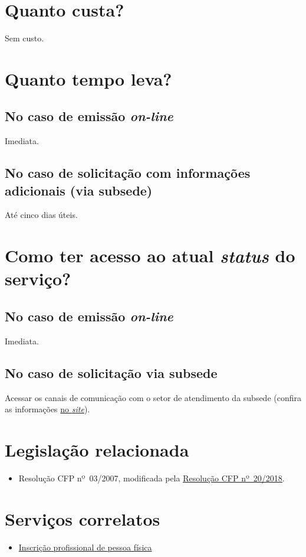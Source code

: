 \section{Quanto custa?}

Sem custo.
\vfill

\section{Quanto tempo leva?}

\subsection{No caso de emissão \emph{on-line}}

Imediata.

\subsection{No caso de solicitação com informações adicionais (via subsede)}

Até cinco dias úteis.
\vfill

\section{Como ter acesso ao atual \emph{status} do serviço?}

\subsection{No caso de emissão \emph{on-line}}

Imediata.

\subsection{No caso de solicitação via subsede}

Acessar os canais de comunicação com o setor de atendimento da subsede (confira as informações \href{https://www.crpsp.org/sede/index}{no \emph{site}}).
\vfill\clearpage

\section{Legislação relacionada}

\begin{itemize}
  \item  Resolução CFP nº~03/2007, modificada pela  \href{https://atosoficiais.com.br/cfp/resolucao-administrativa-financeira-n-20-2018-altera-o-manual-de-procedimentos-administrativo-e-financeiro-do-sistema-conselhos-de-psicologia-anexo-da-resolucao-cfp-n-202018-a-resolucao-cfp-n-03-2007-a-resolucao-cfp-n-16-2019-e-da-outras-providencias}{Resolução  CFP nº~20/2018}.
\end{itemize}

\section{Serviços correlatos}

\begin{itemize}
  \item  \hyperref[chap:pf-inscricao]{Inscrição  profissional de pessoa física}
\end{itemize}

\sumario